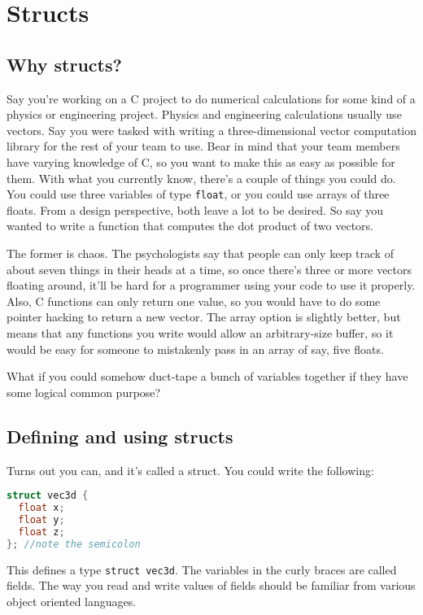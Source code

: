 \documentclass[ebook,11pt,oneside,openany]{memoir}
\begin{document}
\chapter{Structs}
\label{ch:struct}
\section{Why structs?}

Say you're working on a C project to do numerical calculations for some kind of a physics or engineering project. Physics and engineering calculations usually use vectors. Say you were tasked with writing a three-dimensional vector computation library for the rest of your team to use. Bear in mind that your team members have varying knowledge of C, so you want to make this as easy as possible for them. With what you currently know, there's a couple of things you could do. You could use three variables of type \texttt{float}, or you could use arrays of three floats. From a design perspective, both leave a lot to be desired. So say you wanted to write a function that computes the dot product of two vectors. 

The former is chaos. The psychologists say that people can only keep track of about seven things in their heads at a time, so once there's three or more vectors floating around, it'll be hard for a programmer using your code to use it properly. Also, C functions can only return one value, so you would have to do some pointer hacking to return a new vector. The array option is slightly better, but means that any functions you write would allow an arbitrary-size buffer, so it would be easy for someone to mistakenly pass in an array of say, five floats.

What if you could somehow duct-tape a bunch of variables together if they have some logical common purpose?

\section{Defining and using structs}
Turns out you can, and it's called a struct. You could write the following: 

\begin{lstlisting}[language=C]
struct vec3d {
  float x;
  float y;
  float z;
}; //note the semicolon
\end{lstlisting}

This defines a type \texttt{struct vec3d}. The variables in the curly braces are called fields. The way you read and write values of fields should be familiar from various object oriented languages.
\end{document}
